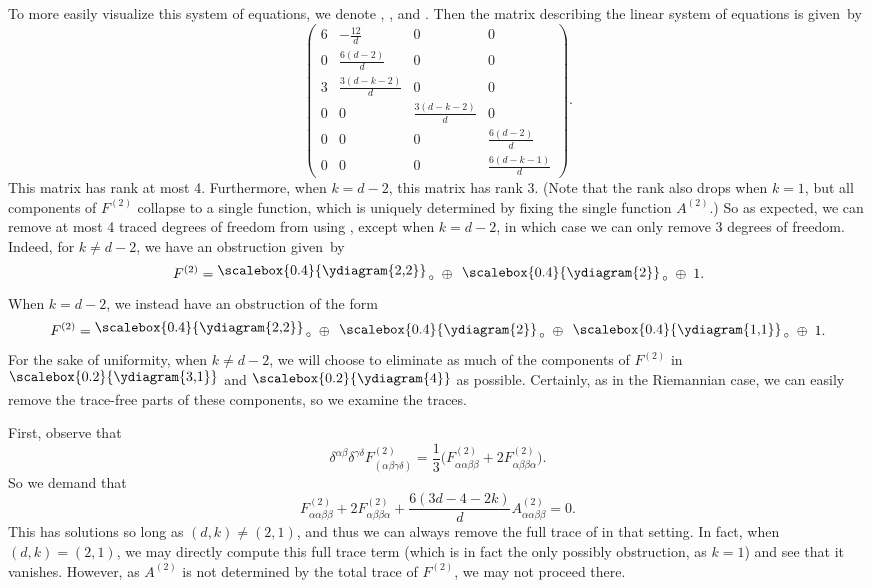 To more easily visualize this system of equations, we denote , , and . Then the matrix describing the linear system of equations is given~by
\[
\begin{pmatrix}
6 & -\frac{12}{d} & 0 & 0 \\[1mm]
0 & \frac{6(d-2)}{d} & 0 & 0 \\[1mm]
3 & \frac{3(d-k-2)}{d} & 0 & 0 \\[1mm]
0 & 0 & \frac{3(d-k-2)}{d} & 0 \\[1mm]
0 & 0 & 0 & \frac{6(d-2)}{d} \\[1mm]
0 & 0 & 0 & \frac{6(d-k-1)}{d}
\end{pmatrix} .
\]
This matrix has rank at most 4. Furthermore, when $k = d-2$, this matrix has rank 3. \big(Note that the rank also drops when $k=1$, but all components of $F^{(2)}$ collapse to a single function, which is uniquely determined by fixing the single function $A^{(2)}$.\big) So as expected, we can remove at most 4 traced degrees of freedom from  using , except when $k = d-2$, in which case we can only remove 3 degrees of freedom. Indeed, for $k \neq d-2$, we have an obstruction given~by
\[
F^{(2)} =
\raisebox{2.5pt}{\scalebox{0.4}{\ydiagram{2,2}}}_{\,\circ}
 \; \oplus \;
 \, \raisebox{1pt}{\scalebox{0.4}{\ydiagram{2}}}_{\,\circ}
 \; \oplus \;
1.
\]
When $k = d-2$, we instead have an obstruction of the form
\[
F^{(2)} =
\raisebox{2.5pt}{\scalebox{0.4}{\ydiagram{2,2}}}_{\,\circ}
 \; \oplus \;
 \, \raisebox{1pt}{\scalebox{0.4}{\ydiagram{2}}}_{\,\circ}
 \; \oplus \;
 \, \raisebox{1pt}{\scalebox{0.4}{\ydiagram{1,1}}}_{\,\circ}
 \; \oplus \;
1.
\]
For the sake of uniformity, when $k \neq d-2$, we will choose to eliminate as much of the components of $F^{(2)}$ in $\raisebox{2.5pt}{\scalebox{0.2}{\ydiagram{3,1}}}$ and $\raisebox{1.5pt}{\scalebox{0.2}{\ydiagram{4}}}$ as possible. Certainly, as in the Riemannian case, we can easily remove the trace-free parts of these components, so we examine the traces.

First, observe that
\[\delta^{\alpha \beta} \delta^{\gamma \delta} F^{(2)}_{(\alpha \beta \gamma \delta)} = \frac{1}{3} \bigl(F^{(2)}_{\alpha \alpha \beta \beta} + 2 F^{(2)}_{\alpha \beta \beta \alpha}\bigr) .\]
So we demand that
\[F^{(2)}_{\alpha \alpha \beta \beta} + 2 F^{(2)}_{\alpha \beta \beta \alpha} + \frac{6(3d-4-2k)}{d} A_{\alpha \alpha \beta \beta}^{(2)} = 0 .\]
This has solutions so long as $(d,k) \neq (2,1)$, and thus we can always remove the full trace of  in that setting. In fact, when $(d,k) = (2,1)$, we may directly compute this full trace term (which is in fact the only possibly obstruction, as $k=1$) and see that it vanishes. However, as $A^{(2)}$ is not determined by the total trace of $F^{(2)}$, we may not proceed there.

